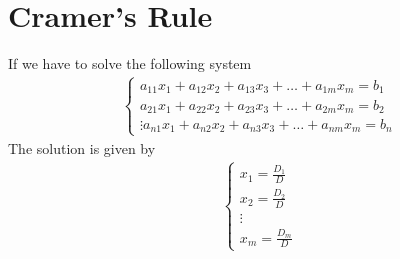 \section{Cramer's Rule}
If we have to solve the following system
\begin{eqnarray}
		\begin{cases}
			a_{11}x_1+a_{12}x_2+a_{13}x_3+\dots+a_{1m}x_m=b_1\\
			a_{21}x_1+a_{22}x_2+a_{23}x_3+\dots+a_{2m}x_m=b_2\\
			\vdots
			a_{n1}x_1+a_{n2}x_2+a_{n3}x_3+\dots+a_{nm}x_m=b_n
		\end{cases}
\end{eqnarray}
The solution is given by
\begin{eqnarray}
	\begin{cases}
		x_1=\frac{D_1}{D}
		\\
		x_2=\frac{D_2}{D}
		\\
		\vdots
		\\
		x_m=\frac{D_m}{D}
	\end{cases}
\end{eqnarray}


